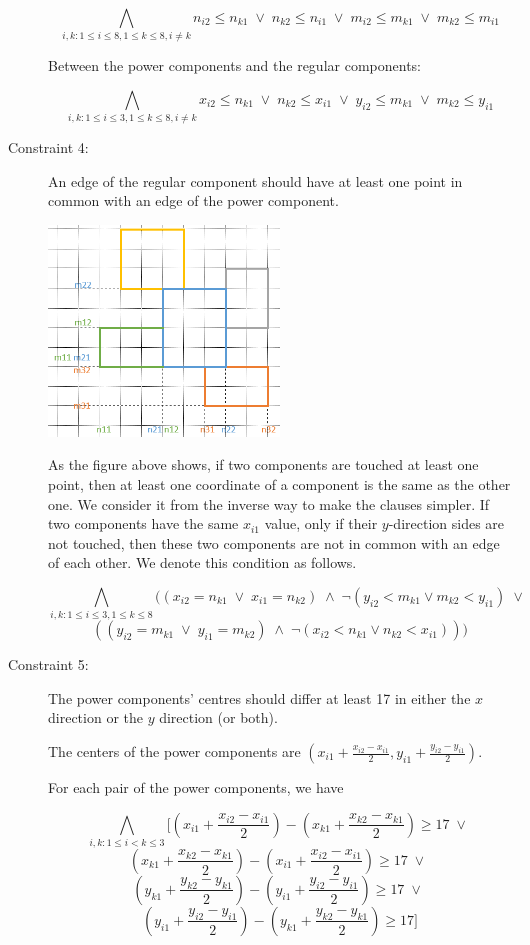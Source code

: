 \documentclass[11pt]{article}
\begin{document}
\begin{description}
  \[  \bigwedge_{i,k: 1 \leq i \leq 8, 1 \leq k \leq 8, i \neq k}
  n_{i2} \leq n_{k1} \; \vee \; n_{k2} \leq n_{i1} \; \vee \; m_{i2} \leq m_{k1} \; \vee \; m_{k2} \leq m_{i1}  \]

  Between the power components and the regular components:

  \[  \bigwedge_{i,k: 1 \leq i \leq 3, 1 \leq k \leq 8, i \neq k}
   x_{i2} \leq n_{k1} \; \vee \; n_{k2} \leq x_{i1} \; \vee \; y_{i2} \leq m_{k1} \; \vee \; m_{k2} \leq y_{i1} \]

  \item[Constraint 4:] An edge of the regular component should have at least one point in common with an edge of the power component.

\begin{center}
\includegraphics[width=0.5\textwidth]{Part1_2_2.png}
\end{center}

  As the figure above shows, if two components are touched at least one point, then at least one coordinate of a component is the same as the other one. We consider it from the inverse way to make the clauses simpler. If two components have the same $x_{i1}$ value, only if their $y$-direction sides are not touched, then these two components are not in common with an edge of each other.
  We denote this condition as follows.

  \[  \bigwedge_{i,k: 1 \leq i \leq 3, 1 \leq k \leq 8}
  ((x_{i2} = n_{k1} \; \vee \; x_{i1} = n_{k2}) \; \wedge \;
  \neg (y_{i2} < m_{k1} \vee m_{k2} < y_{i1}) \; \vee \; \]
  \[  ((y_{i2} = m_{k1} \; \vee \; y_{i1} = m_{k2}) \; \wedge \;
  \neg (x_{i2} < n_{k1} \vee n_{k2} < x_{i1}))) \]
  \item[Constraint 5:] The power components' centres should differ at least 17 in either the $x$ direction or the $y$ direction (or both).

  The centers of the power components are $(x_{i1} + \frac{x_{i2} - x_{i1}}{2}, y_{i1} + \frac{y_{i2} - y_{i1}}{2} )$.

  For each pair of the power components, we have

  \[  \bigwedge_{i,k: 1 \leq i < k \leq 3}
  [ (x_{i1} + \frac{x_{i2} - x_{i1}}{2}) - (x_{k1} + \frac{x_{k2} - x_{k1}}{2}) \geq 17 \; \vee \; \]
  \[ (x_{k1} + \frac{x_{k2} - x_{k1}}{2}) - (x_{i1} + \frac{x_{i2} - x_{i1}}{2}) \geq 17 \; \vee \; \]
  \[ (y_{k1} + \frac{y_{k2} - y_{k1}}{2}) - (y_{i1} + \frac{y_{i2} - y_{i1}}{2}) \geq 17 \; \vee \; \]
  \[ (y_{i1} + \frac{y_{i2} - y_{i1}}{2}) - (y_{k1} + \frac{y_{k2} - y_{k1}}{2}) \geq 17 ] \]


\end{description}
\end{document}
